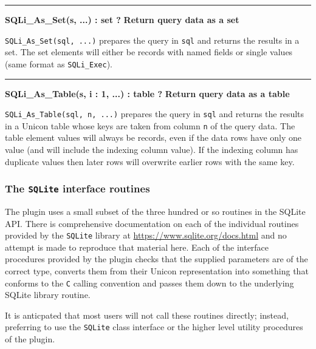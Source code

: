 \bigskip\hrule\vspace{0.1cm}
\noindent
{\bf SQLi\_As\_Set(s, ...) : set ? } \hfill {\bf Return query data as a set}

\noindent
\texttt{SQLi\_As\_Set(sql, ...)}  prepares the query in \texttt{sql} and returns
the results in a set. The set elements will either be records with named
fields or single values (same format as \texttt{SQLi\_Exec}).

\bigskip\hrule\vspace{0.1cm}
\noindent
{\bf SQLi\_As\_Table(s, i : 1, ...) : table ? } \hfill {\bf Return query data as a table}

\noindent
\texttt{SQLi\_As\_Table(sql, n, ...)}  prepares the query in \texttt{sql} and
returns the results in a Unicon table whose keys are taken from column
\texttt{n} of the query data. The table element values will always be records,
even if the data rows have only one value (and will include the indexing column
value). If the indexing column has duplicate values then later rows will
overwrite earlier rows with the same key.
\subsubsection{The \texttt{SQLite} interface routines}

The plugin uses a small subset of the three hundred or so routines in the SQLite
API. There is comprehensive documentation on each of the individual routines
provided by the \texttt{SQLite} library at
\url{https://www.sqlite.org/docs.html} and no attempt is made to reproduce that
material here.  Each of the interface procedures provided by the plugin checks
that the supplied parameters are of the correct type, converts them from their
Unicon representation into something that conforms to the \texttt{C} calling
convention and passes them down to the underlying SQLite library routine.

It is anticpated that most users will not call these routines directly; instead,
preferring to use the \texttt{SQLite} class interface or the higher level
utility procedures of the plugin.

